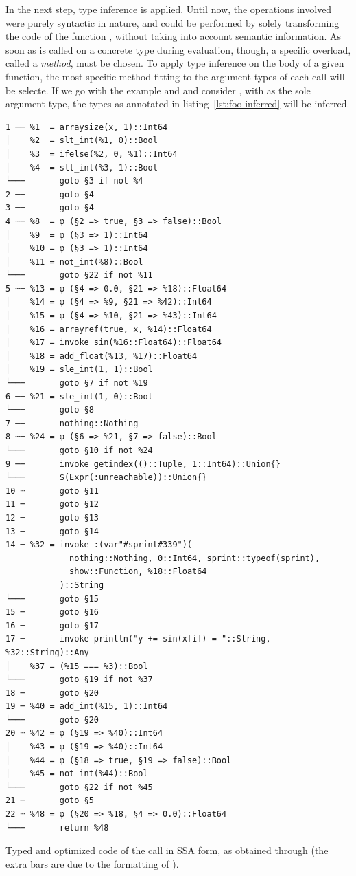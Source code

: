 In the next step, type inference is applied.  Until now, the operations involved were purely
syntactic in nature, and could be performed by solely transforming the code of the function
, without taking into account semantic information.  As soon as  is called on
a concrete type during evaluation, though, a specific overload, called a \emph{method}, must be
chosen.  To apply type inference on the body of a given function, the most specific method fitting
to the argument types of each call will be selecte.  If we go with the example and and consider
, with  as the sole argument type, the types as annotated in
listing~\ref{lst:foo-inferred} will be inferred.

\begin{lstfloat}[p]
  \begin{lstlisting}[style=lstfloat]
1 ── %1  = arraysize(x, 1)::Int64
│    %2  = slt_int(%1, 0)::Bool
│    %3  = ifelse(%2, 0, %1)::Int64
│    %4  = slt_int(%3, 1)::Bool
└───       goto §3 if not %4
2 ──       goto §4
3 ──       goto §4
4 ┄─ %8  = φ (§2 => true, §3 => false)::Bool
│    %9  = φ (§3 => 1)::Int64
│    %10 = φ (§3 => 1)::Int64
│    %11 = not_int(%8)::Bool
└───       goto §22 if not %11
5 ┄─ %13 = φ (§4 => 0.0, §21 => %18)::Float64
│    %14 = φ (§4 => %9, §21 => %42)::Int64
│    %15 = φ (§4 => %10, §21 => %43)::Int64
│    %16 = arrayref(true, x, %14)::Float64
│    %17 = invoke sin(%16::Float64)::Float64
│    %18 = add_float(%13, %17)::Float64
│    %19 = sle_int(1, 1)::Bool
└───       goto §7 if not %19
6 ── %21 = sle_int(1, 0)::Bool
└───       goto §8
7 ──       nothing::Nothing
8 ┄─ %24 = φ (§6 => %21, §7 => false)::Bool
└───       goto §10 if not %24
9 ──       invoke getindex(()::Tuple, 1::Int64)::Union{}
└───       $(Expr(:unreachable))::Union{}
10 ┄       goto §11
11 ─       goto §12
12 ─       goto §13
13 ─       goto §14
14 ─ %32 = invoke :(var"#sprint#339")(
             nothing::Nothing, 0::Int64, sprint::typeof(sprint), 
             show::Function, %18::Float64
           )::String
└───       goto §15
15 ─       goto §16
16 ─       goto §17
17 ─       invoke println("y += sin(x[i]) = "::String, %32::String)::Any
│    %37 = (%15 === %3)::Bool
└───       goto §19 if not %37
18 ─       goto §20
19 ─ %40 = add_int(%15, 1)::Int64
└───       goto §20
20 ┄ %42 = φ (§19 => %40)::Int64
│    %43 = φ (§19 => %40)::Int64
│    %44 = φ (§18 => true, §19 => false)::Bool
│    %45 = not_int(%44)::Bool
└───       goto §22 if not %45
21 ─       goto §5
22 ┄ %48 = φ (§20 => %18, §4 => 0.0)::Float64
└───       return %48
\end{lstlisting}
  \caption{Typed and optimized code of the call \protect{} in SSA form, as obtained
    through \protect{} (the extra bars are due to the formatting of
    \protect{}).\label{lst:foo-typed}}
\end{lstfloat}

